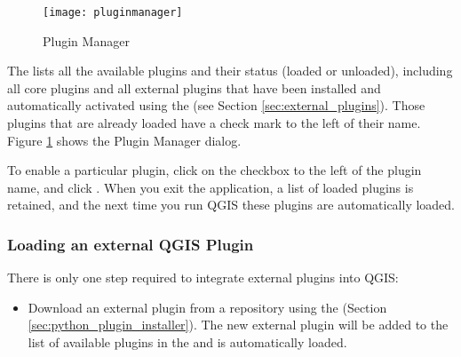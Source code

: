 \begin{figure}[ht]
   \begin{center}
   \caption{Plugin Manager \nixcaption}\label{fig:pluginmanager}\smallskip
   \texttt{[image: pluginmanager]}
\end{center}
\end{figure}

The  lists all the available plugins and their 
status (loaded or unloaded), including all core plugins and all external 
plugins that have been installed and automatically activated using the 
 (see Section \ref{sec:external_plugins}). 
Those plugins that are already loaded have a check mark to the left of 
their name. Figure \ref{fig:pluginmanager} shows the Plugin Manager dialog.

To enable a particular plugin, click on the checkbox to the left of the 
plugin name, and click . When you exit the application, a list 
of loaded plugins is retained, and the next time you run QGIS these 
plugins are automatically loaded.

\begin{Tip}\caption{\textsc{Crashing Plugins}}
\end{Tip} 

\subsubsection{Loading an external QGIS Plugin}\label{sec:load_external_plugin} 

There is only one step required to integrate external plugins into QGIS: 

\begin{itemize}
\item Download an external plugin from a repository using the 
 (Section \ref{sec:python_plugin_installer}).
The new external plugin will be added to the list of available plugins in 
the  and is automatically loaded.
\end{itemize}

